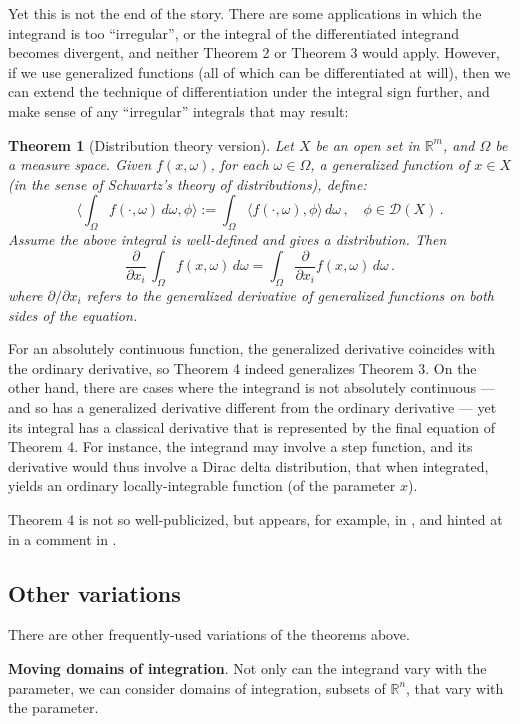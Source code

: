 \documentclass[12pt]{article}
\newcommand{\real}{\mathbb{R}}
\providecommand{\pdxi}[1]{\frac{\partial #1}{\partial x_i}}
\providecommand{\ipdxi}[1]{\partial #1 / \partial x_i}
\newtheorem{thm}{Theorem}
\providecommand{\fnl}[2]{\langle {#1}, {#2} \rangle}
\newcommand{\sD}{\mathcal{D}}
\begin{document}
Yet this is not the end of the story.
There are some applications in which the integrand is too ``irregular'', 
or the integral of the differentiated integrand
becomes divergent, and neither Theorem 2 or Theorem 3 would apply.
However, if we use generalized functions 
(all of which can be differentiated at will),
then we can extend the technique of differentiation under 
the integral sign further,
and make sense of any ``irregular'' integrals that may result:

\begin{thm}[Distribution theory version]
Let $X$ be an open set in $\real^m$, and $\Omega$ be a measure space.
Given $f(x,\omega)$, for each $\omega \in \Omega$, a generalized function of $x \in X$ (in the sense of Schwartz's theory of distributions), 
define:
\[
\fnl{\int_\Omega f(\cdot,\omega) \, d\omega}{\phi} := 
\int_\Omega \fnl{f(\cdot, \omega)}{\phi} \, d\omega\,,
\quad \phi \in \sD(X)\,.
\]
Assume
the above integral is well-defined and gives a distribution.
Then
\[
\pdxi{}  \,
\int_\Omega f(x, \omega) \, d\omega
= \int_\Omega \pdxi{} f(x, \omega) \, d\omega\,.
\]
where $\ipdxi{}$ refers to the generalized derivative 
of generalized functions on both sides of the equation.
\end{thm}

For an absolutely continuous function,
the generalized derivative coincides with the ordinary derivative,
so Theorem 4 indeed generalizes Theorem 3.
On the other hand, there are cases where 
the integrand is not absolutely continuous --- and so
has a generalized derivative different from the ordinary derivative
--- yet its integral has a classical derivative that is
represented by the final equation of Theorem 4.  For instance,
the integrand may involve a step function,
and its derivative would thus involve a Dirac delta distribution,
that when integrated, yields an ordinary locally-integrable
function (of the parameter $x$).

Theorem 4 is not so well-publicized,
but appears, for example, in \cite{Jones}, and hinted
at in a comment in \cite{Schwartz}.

\subsection*{Other variations}

There are other frequently-used variations of the theorems above.

\textbf{Moving domains of integration}.
Not only can the integrand vary with the parameter,
we can consider domains of integration,
subsets of $\real^n$, that vary with the parameter.  
\end{document}
